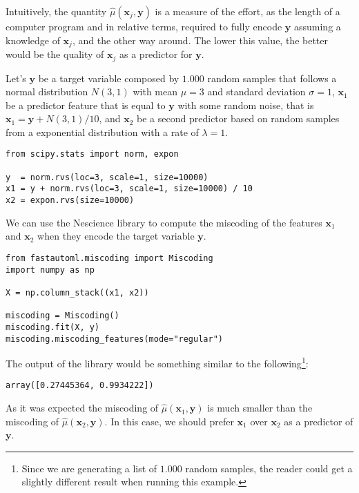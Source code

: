 Intuitively, the quantity $\hat\mu(\mathbf{x}_j, \mathbf{y})$ is a measure of the effort, as the length of a computer program and in relative terms, required to fully encode $\mathbf{y}$ assuming a knowledge of $\mathbf{x}_j$, and the other way around. The lower this value, the better would be the quality of $\mathbf{x}_j$ as a predictor for $\mathbf{y}$.

\begin{example}

Let's $\mathbf{y}$ be a target variable composed by $1.000$ random samples that follows a normal distribution $N(3,1)$ with mean $\mu = 3$ and standard deviation $\sigma = 1$, $\mathbf{x}_1$ be a predictor feature that is equal to $\mathbf{y}$ with some random noise, that is $\mathbf{x}_1 = \mathbf{y} + N(3, 1) / 10$, and $\mathbf{x}_2$ be a second predictor based on random samples from a exponential distribution with a rate of $\lambda = 1$.

\begin{sourcecode}
{\scriptsize \begin{verbatim}
from scipy.stats import norm, expon

y  = norm.rvs(loc=3, scale=1, size=10000)
x1 = y + norm.rvs(loc=3, scale=1, size=10000) / 10
x2 = expon.rvs(size=10000)
\end{verbatim}}
\end{sourcecode}

We can use the Nescience library to compute the miscoding of the features $\mathbf{x}_1$ and $\mathbf{x}_2$ when they encode the target variable $\mathbf{y}$.

\begin{sourcecode}
{\scriptsize \begin{verbatim}
from fastautoml.miscoding import Miscoding
import numpy as np

X = np.column_stack((x1, x2))

miscoding = Miscoding()
miscoding.fit(X, y)
miscoding.miscoding_features(mode="regular")
\end{verbatim}}
\end{sourcecode}

The output of the library would be something similar to the following\footnote{Since we are generating a list of $1.000$ random samples, the reader could get a slightly different result when running this example.}:

\begin{sourcecode}
{\scriptsize \begin{verbatim}
array([0.27445364, 0.9934222])
\end{verbatim}}
\end{sourcecode}

As it was expected the miscoding of $\hat\mu(\mathbf{x}_1, \mathbf{y})$ is much smaller than the miscoding of $\hat\mu(\mathbf{x}_2, \mathbf{y})$. In this case, we should prefer $\mathbf{x}_1$ over $\mathbf{x}_2$ as a predictor of $\mathbf{y}$.

\end{example}

